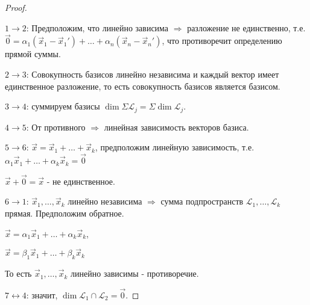 \begin{proof}~

    $1 \to 2$: Предположим, что линейно зависима $\Rightarrow$ разложение не единственно, т.е. $\vec{0} = \alpha_1(\vec{x}_1 - \vec{x}_1') + \ldots + \alpha_n(\vec{x}_n - \vec{x}_n')$, что противоречит определению прямой суммы.

    \bigbreak

    $2 \to 3$: Совокупность базисов линейно независима и каждый вектор имеет единственное разложение, то есть совокупность базисов является базисом.

    \bigbreak

    $3 \to 4$: суммируем базисы $\dim \Sigma \mathcal{L}_j = \Sigma \dim \mathcal{L}_j$.

    \bigbreak

    $4 \to 5$: От противного $\Rightarrow$ линейная зависимость векторов базиса.

    \bigbreak

    $5 \to 6$: $\vec{x} = \vec{x}_1 + \ldots + \vec{x}_k$, предположим линейную зависимость, т.е. $\alpha_1\vec{x}_1 + \ldots + \alpha_k\vec{x}_k = \vec{0}$

    $\vec{x} + \vec{0} = \vec{x}$ - не единственное.

    \bigbreak

    $6 \to 1$: $\vec{x}_1,\ldots,\vec{x}_k$ линейно независима $\Rightarrow$ сумма подпространств $\mathcal{L}_1, \ldots, \mathcal{L}_k$ прямая. Предположим обратное. 

    $\vec{x} = \alpha_1\vec{x}_1 + \ldots + \alpha_k\vec{x}_k$,
    
    $\vec{x} = \beta_1\vec{x}_1 + \ldots + \beta_k\vec{x}_k$

    То есть $\vec{x}_1,\ldots,\vec{x}_k$ линейно зависимы - противоречие.

    \bigbreak

    $7\leftrightarrow 4$: значит, $\dim \mathcal{L}_1 \cap \mathcal{L}_2 = \vec{0}$.
\end{proof}
